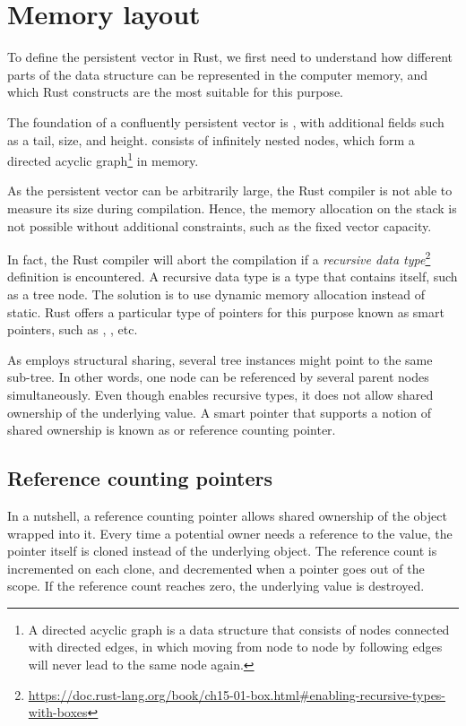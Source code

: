 
\section{Memory layout}
To define the persistent vector in Rust, we first need to understand how different parts of the data structure can be represented in the computer memory, and which Rust constructs are the most suitable for this purpose.

The foundation of a confluently persistent vector is \rrbtree{}, with additional fields such as a tail, size, and height. \rrbtree{} consists of infinitely nested nodes, which form a directed acyclic graph\footnote{A directed acyclic graph is a data structure that consists of nodes connected with directed edges, in which moving from node to node by following edges will never lead to the same node again.} in memory.

As the persistent vector can be arbitrarily large, the Rust compiler is not able to measure its size during compilation. Hence, the memory allocation on the stack is not possible without additional constraints, such as the fixed vector capacity.

In fact, the Rust compiler will abort the compilation if a \emph{recursive data type}\footnote{\url{https://doc.rust-lang.org/book/ch15-01-box.html\#enabling-recursive-types-with-boxes}} definition is encountered. A recursive data type is a type that contains itself, such as a tree node. The solution is to use dynamic memory allocation instead of static. Rust offers a particular type of pointers for this purpose known as smart pointers, such as \boxptr{}, \rc{}, etc.

As \rrbtree{} employs structural sharing, several tree instances might point to the same sub-tree. In other words, one node can be referenced by several parent nodes simultaneously. Even though \boxptr{} enables recursive types, it does not allow shared ownership of the underlying value. A smart pointer that supports a notion of shared ownership is known as \rc{} or reference counting pointer.

\subsection{Reference counting pointers}
In a nutshell, a reference counting pointer allows shared ownership of the object wrapped into it. Every time a potential owner needs a reference to the value, the pointer itself is cloned instead of the underlying object. The reference count is incremented on each clone, and decremented when a pointer goes out of the scope. If the reference count reaches zero, the underlying value is destroyed.

